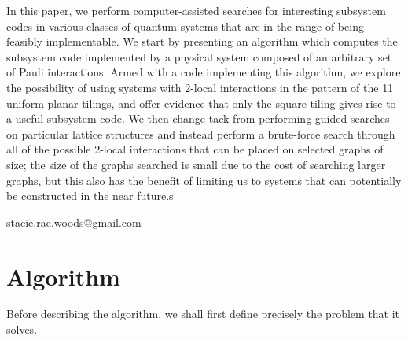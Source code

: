 \documentclass[twocolumn,showpacs,preprintnumbers,amsmath,amssymb,nofootinbib,pra,floatfix]{revtex4}
\begin{document}
In this paper, we perform computer-assisted searches for interesting subsystem codes in various classes of quantum systems that are in the range of being feasibly implementable.  We start by presenting an algorithm which computes the subsystem code implemented by a physical system composed of an arbitrary set of Pauli interactions.  Armed with a code implementing this algorithm, we explore the possibility of using systems with 2-local interactions in the pattern of the 11 uniform planar tilings, and offer evidence that only the square tiling gives rise to a useful subsystem code.  We then change tack from performing guided searches on particular lattice structures and instead perform a brute-force search through all of the possible 2-local interactions that can be placed on selected graphs of  size; the size of the graphs searched is small due to the cost of searching larger graphs, but this also has the benefit of limiting us to systems that can potentially be constructed in the near future.s



stacie.rae.woods@gmail.com
\section{Algorithm}

Before describing the algorithm, we shall first define precisely the problem that it solves.
\end{document}
